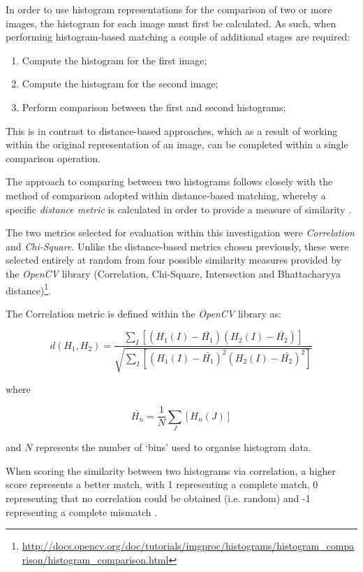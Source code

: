 In order to use histogram representations for the comparison of two or more images, the histogram for each image must first be calculated. As such, when performing histogram-based matching a couple of additional stages are required:

\begin{enumerate}
	\item Compute the histogram for the first image;
	\item Compute the histogram for the second image;
	\item Perform comparison between the first and second histograms;
\end{enumerate}

This is in contrast to distance-based approaches, which as a result of working within the original representation of an image, can be completed within a single comparison operation. 

The approach to comparing between two histograms follows closely with the method of comparison adopted within distance-based matching, whereby a specific \textit{distance metric} is calculated in order to provide a measure of similarity \cite{bradski2008learning}. 

The two metrics selected for evaluation within this investigation were \textit{Correlation} and \textit{Chi-Square}. Unlike the distance-based metrics chosen previously, these were selected entirely at random from four possible similarity measures provided by the \textit{OpenCV} library (Correlation, Chi-Square, Intersection and Bhattacharyya distance)\footnote{\url{http://docs.opencv.org/doc/tutorials/imgproc/histograms/histogram_comparison/histogram_comparison.html}}.

The Correlation metric is defined within the \textit{OpenCV} library as:

\begin{equation}
d(H_{1}, H_{2}) = \frac{\sum\nolimits_{I}[(H_{1}(I) - \bar{H_{1}})(H_{2}(I) - \bar{H_{2}})]}{\sqrt{\sum\nolimits_{I}[(H_{1}(I) - \bar{H_{1}})^2(H_{2}(I) - \bar{H_{2}})^2]}}
\end{equation}

where

\begin{equation}
\bar{H_{n}} = \frac{1}{N}\sum\limits_{J}[H_{n}(J)]
\end{equation}

and $N$ represents the number of `bins' used to organise histogram data. 

When scoring the similarity between two histograms via correlation, a higher score represents a better match, with 1 representing a complete match, 0 representing that no correlation could be obtained (i.e. random) and -1 representing a complete mismatch \cite{bradski2008learning}.

